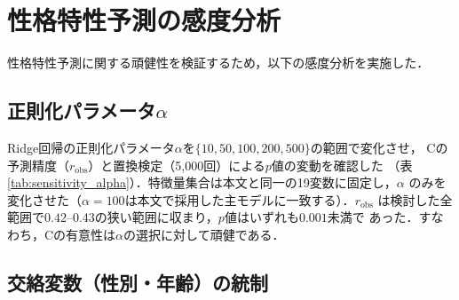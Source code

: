 \documentclass[dvipdfmx,11pt,a4paper]{bxjsarticle}
\renewcommand{\_}{\paperorigunderscore\allowbreak}%
\begin{document}





\section{性格特性予測の感度分析}
\label{sec:appendix_sensitivity}

性格特性予測に関する頑健性を検証するため，以下の感度分析を実施した．

\subsection{正則化パラメータ$\alpha$}
Ridge回帰の正則化パラメータ$\alpha$を$\{10, 50, 100, 200, 500\}$の範囲で変化させ，
Cの予測精度（$r_{\text{obs}}$）と置換検定（5,000回）による$p$値の変動を確認した
（表\ref{tab:sensitivity_alpha}）．特徴量集合は本文と同一の19変数に固定し，$\alpha$
のみを変化させた（$\alpha = 100$は本文で採用した主モデルに一致する）．$r_{\text{obs}}$
は検討した全範囲で$0.42$--$0.43$の狭い範囲に収まり，$p$値はいずれも$0.001$未満で
あった．すなわち，Cの有意性は$\alpha$の選択に対して頑健である．

\begin{table}[htbp]
\centering
\caption{正則化パラメータ$\alpha$に対する感度（Big5次元C，4モデル平均，
5-fold CV，置換検定5,000回）．$^{\dagger}$は本文で採用した$\alpha = 100$を表す．
$\alpha = 100$の$r_{\text{obs}} = 0.4315$は本文の3桁表記$0.432$に対応する．}
\label{tab:sensitivity_alpha}

\end{table}

\subsection{交絡変数（性別・年齢）の統制}
\label{sec:appendix_confound}
\end{document}
